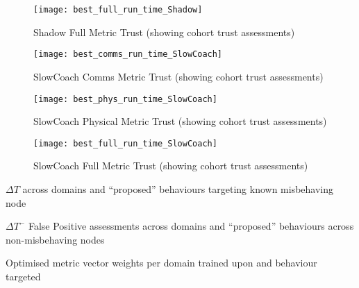 \begin{figure}[h]
  \centering
  \texttt{[image: best\_full\_run\_time\_Shadow]}
  \caption{Shadow Full Metric Trust (showing cohort trust assessments)}
  \label{fig:full_time_shadow}
\end{figure}



\begin{figure}[h]
  \centering
  \texttt{[image: best\_comms\_run\_time\_SlowCoach]}
  \caption{SlowCoach Comms Metric Trust (showing cohort trust assessments)}
  \label{fig:comms_time_slowcoach}
\end{figure}

\begin{figure}[h]
  \centering
  \texttt{[image: best\_phys\_run\_time\_SlowCoach]}
  \caption{SlowCoach Physical Metric Trust (showing cohort trust assessments)}
  \label{fig:phys_time_slowcoach}
\end{figure}

\begin{figure}[h]
  \centering
  \texttt{[image: best\_full\_run\_time\_SlowCoach]}
  \caption{SlowCoach Full Metric Trust (showing cohort trust assessments)}
  \label{fig:full_time_slowcoach}
\end{figure}

\begin{table}
  \centering
  \caption{$\Delta T$ across domains and ``proposed'' behaviours targeting known misbehaving node}
  
  \label{tab:domain_deltas}
\end{table}

\begin{table}
  \centering
  \caption{$\Delta T^-$ False Positive assessments across domains and ``proposed'' behaviours across non-misbehaving nodes}
  
  \label{tab:domain_deltas_minus}
\end{table}

\begin{landscape}
  \begin{table}
    \centering
    \caption{Optimised metric vector weights per domain trained upon and behaviour targeted}
    
    \label{tab:optimised_weights}
  \end{table}
\end{landscape}


